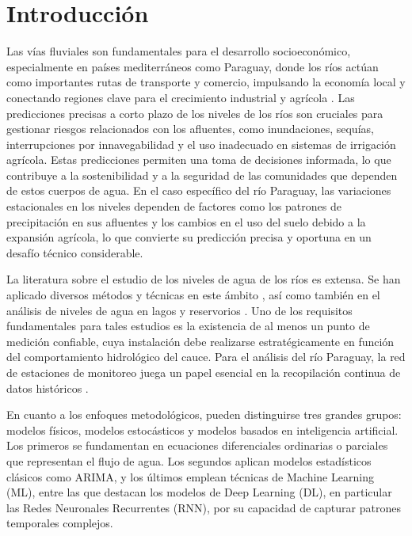 \clearpage %
\chapter{Introducción}
\label{sec:introduccion}

Las vías fluviales son fundamentales para el desarrollo socioeconómico, especialmente en países mediterráneos como Paraguay, donde los ríos actúan como importantes rutas de transporte y comercio, impulsando la economía local y conectando regiones clave para el crecimiento industrial y agrícola \cite{sistema-pronostico-conacyt-14-INV-280}. Las predicciones precisas a corto plazo de los niveles de los ríos son cruciales para gestionar riesgos relacionados con los afluentes, como inundaciones, sequías, interrupciones por innavegabilidad y el uso inadecuado en sistemas de irrigación agrícola. Estas predicciones permiten una toma de decisiones informada, lo que contribuye a la sostenibilidad y a la seguridad de las comunidades que dependen de estos cuerpos de agua. En el caso específico del río Paraguay, las variaciones estacionales en los niveles dependen de factores como los patrones de precipitación en sus afluentes y los cambios en el uso del suelo debido a la expansión agrícola, lo que convierte su predicción precisa y oportuna en un desafío técnico considerable.

La literatura sobre el estudio de los niveles de agua de los ríos es extensa. Se han aplicado diversos métodos y técnicas en este ámbito \cite{doi:10.1080/02626660009492354,s21196504,142442,doi:10.1080/19942060.2021.2019128,Faruq_2020,2964-6390-1-SM,articleMashuri,inproceedings}, así como también en el análisis de niveles de agua en lagos y reservorios \cite{EHTERAM20212193,ijgi9080479,ijeska842150,Piasecki_Adam_Application_2021,10.1117/12.2627470,ijeska896435,su14031843,Filimon}. Uno de los requisitos fundamentales para tales estudios es la existencia de al menos un punto de medición confiable, cuya instalación debe realizarse estratégicamente en función del comportamiento hidrológico del cauce. Para el análisis del río Paraguay, la red de estaciones de monitoreo juega un papel esencial en la recopilación continua de datos históricos \cite{amarilla2023comparative}.

En cuanto a los enfoques metodológicos, pueden distinguirse tres grandes grupos: modelos físicos, modelos estocásticos y modelos basados en inteligencia artificial. Los primeros se fundamentan en ecuaciones diferenciales ordinarias o parciales que representan el flujo de agua. Los segundos aplican modelos estadísticos clásicos como ARIMA, y los últimos emplean técnicas de Machine Learning (ML), entre las que destacan los modelos de Deep Learning (DL), en particular las Redes Neuronales Recurrentes (RNN), por su capacidad de capturar patrones temporales complejos.

